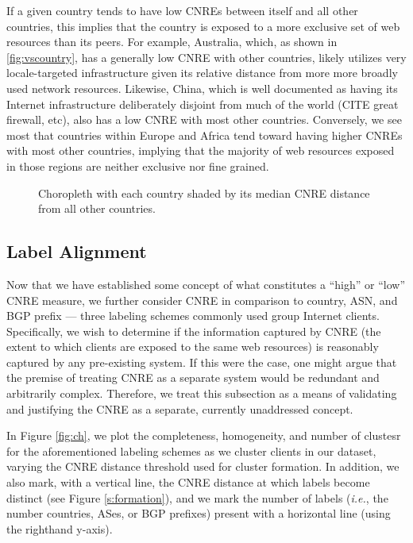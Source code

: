 If a given country tends to have low CNREs between itself and all other
countries, this implies that the country is exposed to a more exclusive set of
web resources than its peers. For example, Australia, which, as shown in
\ref{fig:vscountry}, has a generally low CNRE with other countries, likely
utilizes very locale-targeted infrastructure given its relative distance from
more more broadly used network resources. Likewise, China, which is well
documented as having its Internet infrastructure deliberately disjoint from much
of the world (CITE great firewall, etc), also has a low CNRE with most other
countries. Conversely, we see most that countries within Europe and Africa tend
toward having higher CNREs with most other countries, implying that the majority
of web resources exposed in those regions are neither exclusive nor fine grained. 

\begin{figure}


    \caption{Choropleth with each country shaded by its median CNRE distance
    from all other countries.}
    \label{fig:cnredist}

\end{figure}

\subsection{Label Alignment}
\label{s:labelalgn}

Now that we have established some concept of what constitutes a ``high'' or
``low'' CNRE measure, we further consider CNRE in comparison to country, ASN,
and BGP prefix --- three labeling schemes commonly used group Internet clients.
Specifically, we wish to determine if the information captured by
CNRE (the extent to which clients are exposed to the same web resources) is
reasonably captured by any pre-existing system. If this were the case, one might
argue that the premise of treating CNRE as a separate system would be redundant
and arbitrarily complex. Therefore, we treat this subsection as a means of
validating and justifying the CNRE as a separate, currently unaddressed concept.

In Figure \ref{fig:ch}, we plot the completeness, homogeneity, and number of
clustesr for the aforementioned labeling schemes as we cluster clients in our
dataset, varying the CNRE distance threshold used for cluster formation. In
addition, we also mark, with a vertical line, the CNRE distance at which labels
become distinct (see Figure \ref{s:formation}), and we mark the number of labels
(\emph{i.e.}, the number countries, ASes, or BGP prefixes) present with a
horizontal line (using the righthand y-axis). 

